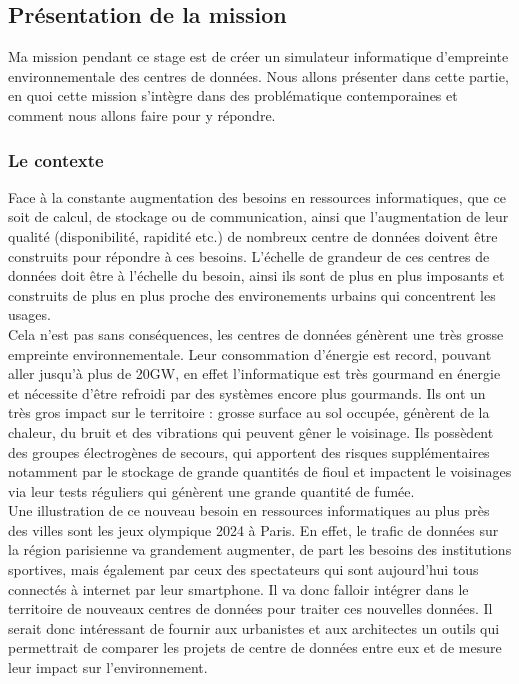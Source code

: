 \subsection{Présentation de la mission}
Ma mission pendant ce stage est de créer un simulateur informatique d'empreinte environnementale des centres de données. Nous allons présenter dans cette partie, en quoi cette mission s'intègre dans des problématique contemporaines et comment nous allons faire pour y répondre.

\subsubsection{Le contexte}
Face à la constante augmentation des besoins en ressources informatiques, que ce soit de calcul, de stockage ou de communication, ainsi que l'augmentation de leur qualité (disponibilité, rapidité etc.) de nombreux centre de données doivent être construits pour répondre à ces besoins. L'échelle de grandeur de ces centres de données doit être à l'échelle du besoin, ainsi ils sont de plus en plus imposants et construits de plus en plus proche des environements urbains qui concentrent les usages.\\

Cela n'est pas sans conséquences, les centres de données génèrent une très grosse empreinte environnementale. Leur consommation d'énergie est record, pouvant aller jusqu'à plus de 20GW, en effet l'informatique est très gourmand en énergie et nécessite d'être refroidi par des systèmes encore plus gourmands. Ils ont un très gros impact sur le territoire : grosse surface au sol occupée, génèrent de la chaleur, du bruit et des vibrations qui peuvent gêner le voisinage. Ils possèdent des groupes électrogènes de secours, qui apportent des risques supplémentaires notamment par le stockage de grande quantités de fioul et impactent le voisinages via leur tests réguliers qui génèrent une grande quantité de fumée.\\

Une illustration de ce nouveau besoin en ressources informatiques au plus près des villes sont les jeux olympique 2024 à Paris. En effet, le trafic de données sur la région parisienne va grandement augmenter, de part les besoins des institutions sportives, mais également par ceux des spectateurs qui sont aujourd'hui tous connectés à internet par leur smartphone. Il va donc falloir intégrer dans le territoire de nouveaux centres de données pour traiter ces nouvelles données. Il serait donc intéressant de fournir aux urbanistes et aux architectes un outils qui permettrait de comparer les projets de centre de données entre eux et de mesure leur impact sur l'environnement.\\

